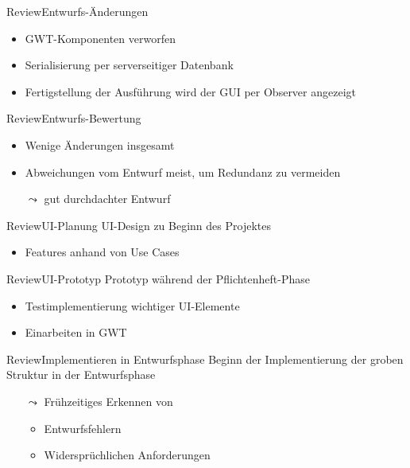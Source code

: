\documentclass[10pt]{beamer}
\begin{document}
\begin{frame}{Review}{Entwurfs-Änderungen}
	\begin{itemize}
		\item GWT-Komponenten verworfen
		\item Serialisierung per serverseitiger Datenbank
		\item Fertigstellung der Ausführung wird der GUI per Observer angezeigt
	\end{itemize}
\end{frame}

\begin{frame}{Review}{Entwurfs-Bewertung}
	\begin{itemize}
		\item Wenige Änderungen insgesamt
		\item Abweichungen vom Entwurf meist, um Redundanz zu vermeiden
		\item [] $\leadsto$ gut durchdachter Entwurf
	\end{itemize}
\end{frame}

\begin{frame}{Review}{UI-Planung}
UI-Design zu Beginn des Projektes
	\begin{itemize}
		\item Features anhand von Use Cases
	\end{itemize}
\end{frame}

\begin{frame}{Review}{UI-Prototyp}
Prototyp während der Pflichtenheft-Phase
	\begin{itemize}
		\item Testimplementierung wichtiger UI-Elemente
		\item Einarbeiten in GWT
	\end{itemize}
\end{frame}

\begin{frame}{Review}{Implementieren in Entwurfsphase}
Beginn der Implementierung der groben Struktur in der Entwurfsphase 
	\begin{itemize}
		\item[$\leadsto$] Frühzeitiges Erkennen von 
		\begin{itemize}
			\item Entwurfsfehlern
			\item Widersprüchlichen Anforderungen
		\end{itemize}
	\end{itemize}
\end{frame}
\end{document}
